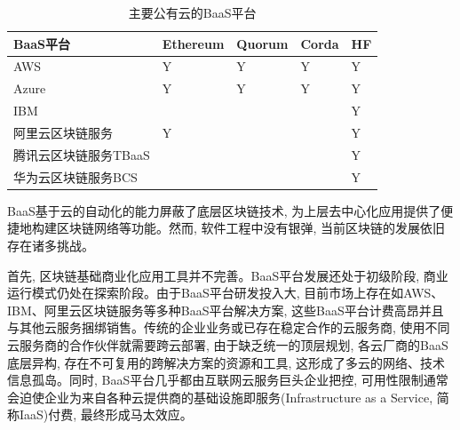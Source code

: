 {\footnotesize
\begin{longtable}[h]{m{100pt} m{50pt} m{50pt} m{50pt} m{50pt}}
    \caption[主要公有云的BaaS平台]{主要公有云的BaaS平台} \label{major_BaaS_platforms} \\
        \toprule  
        \textbf{BaaS平台}&\textbf{Ethereum}&\textbf{Quorum}&\textbf{Corda}&\textbf{HF}\\
        \hline
        
        AWS&Y&Y&Y&Y\\

        Azure&Y&Y&Y&Y\\

        IBM& & & &Y\\

        阿里云区块链服务&Y& & &Y\\

        腾讯云区块链服务TBaaS& & & &Y\\

        华为云区块链服务BCS& & & &Y\\
        \bottomrule
    \end{longtable}
}



BaaS基于云的自动化的能力屏蔽了底层区块链技术, 为上层去中心化应用提供了便捷地构建区块链网络等功能。然而, 软件工程中没有银弹, 当前区块链的发展依旧存在诸多挑战。

首先, 区块链基础商业化应用工具并不完善\footnotemark[1]。BaaS平台发展还处于初级阶段, 商业运行模式仍处在探索阶段。由于BaaS平台研发投入大, 目前市场上存在如AWS、IBM、阿里云区块链服务等多种BaaS平台解决方案, 这些BaaS平台计费高昂\footnotemark[2]并且与其他云服务捆绑销售。传统的企业业务或已存在稳定合作的云服务商, 使用不同云服务商的合作伙伴就需要跨云部署, 由于缺乏统一的顶层规划, 各云厂商的BaaS底层异构, 存在不可复用的跨解决方案的资源和工具, 这形成了多云的网络\cite{DBLP:conf/coins/GerritsKKFV21}、技术信息孤岛。同时, BaaS平台几乎都由互联网云服务巨头企业把控, 可用性限制通常会迫使企业为来自各种云提供商的基础设施即服务(Infrastructure as a Service, 简称IaaS)付费, 最终形成马太效应\cite{KuernetesbasedFabricChaincodeManagementAndHihgAvailabilityTechnology}。

